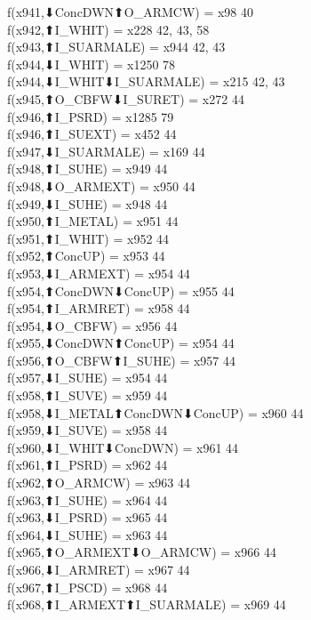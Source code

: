 f(x941,⬇ConcDWN⬆O_ARMCW) = x98 {40} \\
f(x942,⬆I_WHIT) = x228 {42, 43, 58} \\
f(x943,⬆I_SUARMALE) = x944 {42, 43} \\
f(x944,⬇I_WHIT) = x1250 {78} \\
f(x944,⬇I_WHIT⬇I_SUARMALE) = x215 {42, 43} \\
f(x945,⬆O_CBFW⬇I_SURET) = x272 {44} \\
f(x946,⬆I_PSRD) = x1285 {79} \\
f(x946,⬆I_SUEXT) = x452 {44} \\
f(x947,⬇I_SUARMALE) = x169 {44} \\
f(x948,⬆I_SUHE) = x949 {44} \\
f(x948,⬇O_ARMEXT) = x950 {44} \\
f(x949,⬇I_SUHE) = x948 {44} \\
f(x950,⬆I_METAL) = x951 {44} \\
f(x951,⬆I_WHIT) = x952 {44} \\
f(x952,⬆ConcUP) = x953 {44} \\
f(x953,⬇I_ARMEXT) = x954 {44} \\
f(x954,⬆ConcDWN⬇ConcUP) = x955 {44} \\
f(x954,⬆I_ARMRET) = x958 {44} \\
f(x954,⬇O_CBFW) = x956 {44} \\
f(x955,⬇ConcDWN⬆ConcUP) = x954 {44} \\
f(x956,⬆O_CBFW⬆I_SUHE) = x957 {44} \\
f(x957,⬇I_SUHE) = x954 {44} \\
f(x958,⬆I_SUVE) = x959 {44} \\
f(x958,⬇I_METAL⬆ConcDWN⬇ConcUP) = x960 {44} \\
f(x959,⬇I_SUVE) = x958 {44} \\
f(x960,⬇I_WHIT⬇ConcDWN) = x961 {44} \\
f(x961,⬆I_PSRD) = x962 {44} \\
f(x962,⬆O_ARMCW) = x963 {44} \\
f(x963,⬆I_SUHE) = x964 {44} \\
f(x963,⬇I_PSRD) = x965 {44} \\
f(x964,⬇I_SUHE) = x963 {44} \\
f(x965,⬆O_ARMEXT⬇O_ARMCW) = x966 {44} \\
f(x966,⬇I_ARMRET) = x967 {44} \\
f(x967,⬆I_PSCD) = x968 {44} \\
f(x968,⬆I_ARMEXT⬆I_SUARMALE) = x969 {44} \\
